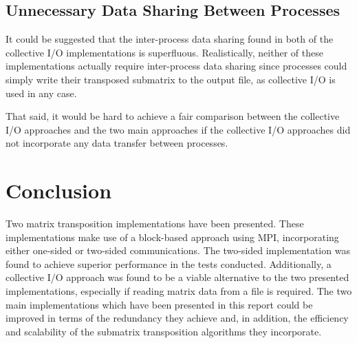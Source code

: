 \documentclass[journal,10pt,a4paper]{IEEEtran}
\begin{document}
\subsection{Unnecessary Data Sharing Between Processes}
It could be suggested that the inter-process data sharing found in both of the collective I/O implementations is superfluous. Realistically, neither of these implementations actually require inter-process data sharing since processes could simply write their transposed submatrix to the output file, as collective I/O is used in any case. 

That said, it would be hard to achieve a fair comparison between the collective I/O approaches and the two main approaches if the collective I/O approaches did not incorporate any data transfer between processes.




\section{Conclusion}
Two matrix transposition implementations have been presented. These implementations make use of a block-based approach using MPI, incorporating either one-sided or two-sided communications. The two-sided implementation was found to achieve superior performance in the tests conducted. Additionally, a collective I/O approach was found to be a viable alternative to the two presented implementations, especially if reading matrix data from a file is required. The two main implementations which have been presented in this report could be improved in terms of the redundancy they achieve and, in addition, the efficiency and scalability of the submatrix transposition algorithms they incorporate.


\clearpage
\onecolumn

\printbibliography





\ifCLASSOPTIONcaptionsoff
  \newpage
\fi





%
%
%
\end{document}
